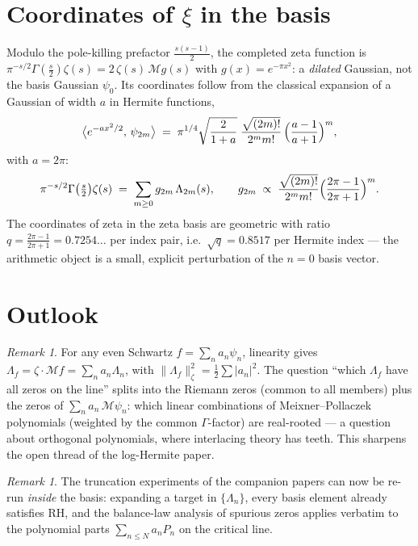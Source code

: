 \documentclass[11pt]{article}
\theoremstyle{remark}
\newtheorem{remark}[theorem]{Remark}
\newcommand{\M}{\mathcal{M}}
\begin{document}
\section{Coordinates of $\xi$ in the basis}

Modulo the pole-killing prefactor $\frac{s(s-1)}{2}$, the completed zeta function is
$\pi^{-s/2}\Gamma(\tfrac s2)\zeta(s) = 2\,\zeta(s)\, \M g(s)$ with $g(x) = e^{-\pi x^2}$: a \emph{dilated} Gaussian, not the basis Gaussian $\psi_0$. Its coordinates follow from the classical expansion of a Gaussian of width $a$ in Hermite functions,
\[
\bigl\langle e^{-a x^2/2},\, \psi_{2m} \bigr\rangle
\;=\; \pi^{1/4}\sqrt{\frac{2}{1+a}}\;
\frac{\sqrt{(2m)!}}{2^m m!}\,
\Bigl(\frac{a-1}{a+1}\Bigr)^{m},
\]
with $a = 2\pi$:
\begin{equation}
\pi^{-s/2}\Gamma\bigl(\tfrac s2\bigr)\zeta(s) \;=\; \sum_{m \ge 0} g_{2m}\, \Lambda_{2m}(s),
\qquad
g_{2m} \;\propto\; \frac{\sqrt{(2m)!}}{2^m m!} \Bigl(\frac{2\pi - 1}{2\pi + 1}\Bigr)^{m}.
\end{equation}
The coordinates of zeta in the zeta basis are geometric with ratio
$q = \frac{2\pi - 1}{2\pi + 1} = 0.7254\ldots$ per index pair, i.e.\ $\sqrt{q} = 0.8517$ per Hermite index --- the arithmetic object is a small, explicit perturbation of the $n = 0$ basis vector.

\section{Outlook}

\begin{remark}
For any even Schwartz $f = \sum_n a_n \psi_n$, linearity gives $\Lambda_f = \zeta \cdot \M f = \sum_n a_n \Lambda_n$, with $\|\Lambda_f\|^2_\zeta = \tfrac12\sum |a_n|^2$. The question ``which $\Lambda_f$ have all zeros on the line'' splits into the Riemann zeros (common to all members) plus the zeros of $\sum_n a_n\,\M\psi_n$: which linear combinations of Meixner--Pollaczek polynomials (weighted by the common $\Gamma$-factor) are real-rooted --- a question about orthogonal polynomials, where interlacing theory has teeth. This sharpens the open thread of the log-Hermite paper.
\end{remark}

\begin{remark}
The truncation experiments of the companion papers can now be re-run \emph{inside} the basis: expanding a target in $\{\Lambda_n\}$, every basis element already satisfies RH, and the balance-law analysis of spurious zeros applies verbatim to the polynomial parts $\sum_{n \le N} a_n P_n$ on the critical line.
\end{remark}
\end{document}
